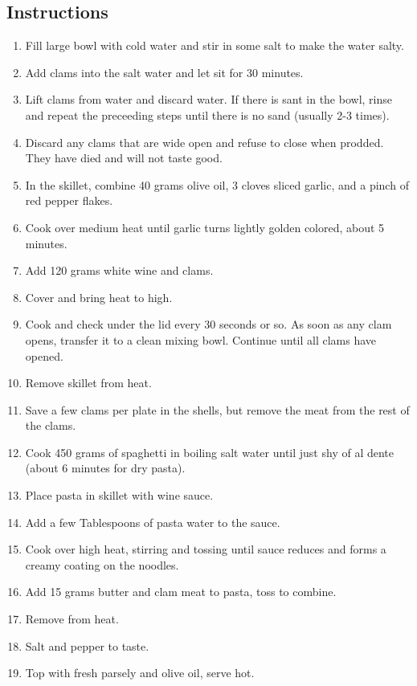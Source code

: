 \begin{multicols}{2}
\subsection*{Instructions}
\begin{enumerate}
    \item Fill large bowl with cold water and stir in some salt to make the water salty.
    \item Add clams into the salt water and let sit for 30 minutes.
    \item Lift clams from water and discard water. If there is sant in the bowl, rinse and repeat the preceeding steps until there is no sand (usually 2-3 times).
    \item Discard any clams that are wide open and refuse to close when prodded. They have died and will not taste good.
    \item In the skillet, combine 40 grams olive oil, 3 cloves sliced garlic, and a pinch of red pepper flakes.
    \item Cook over medium heat until garlic turns lightly golden colored, about 5 minutes.
    \item Add 120 grams white wine and clams.
    \item Cover and bring heat to high.
    \item Cook and check under the lid every 30 seconds or so. As soon as any clam opens, transfer it to a clean mixing bowl. Continue until all clams have opened.
    \item Remove skillet from heat.
    \item Save a few clams per plate in the shells, but remove the meat from the rest of the clams.
    \item Cook 450 grams of spaghetti in boiling salt water until just shy of al dente (about 6 minutes for dry pasta).
    \item Place pasta in skillet with wine sauce.
    \item Add a few Tablespoons of pasta water to the sauce.
    \item Cook over high heat, stirring and tossing until sauce reduces and forms a creamy coating on the noodles.
    \item Add 15 grams butter and clam meat to pasta, toss to combine.
    \item Remove from heat.
    \item Salt and pepper to taste.
    \item Top with fresh parsely and olive oil, serve hot.
\end{enumerate}


\end{multicols}
